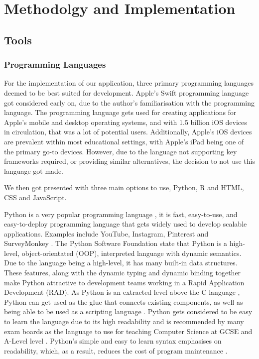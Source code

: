 \chapter{Methodolgy and Implementation}
	\label{chap:implementation}
	
	\section{Tools}
	
	\subsection{Programming Languages}
	
	For the implementation of our application, three primary programming languages deemed to be best suited for development. Apple's Swift programming language \cite{swift} got considered early on, due to the author's familiarisation with the programming language. The programming language gets used for creating applications for Apple's mobile and desktop operating systems, and with 1.5 billion \cite{9to5mac} iOS devices in circulation, that was a lot of potential users. Additionally, Apple's iOS devices are prevalent within most educational settings, with Apple's iPad being one of the primary go-to devices. However, due to the language not supporting key frameworks required, or providing similar alternatives, the decision to not use this language got made. 
	
	We then got presented with three main options to use, Python, R and HTML, CSS and JavaScript.
	
	Python is a very popular programming language \cite{wired_python, sof_dev_servay20}, it is fast, easy-to-use, and easy-to-deploy programming language that gets widely used to develop scalable applications. Examples include YouTube, Instagram, Pinterest and SurveyMonkey \cite{hackr.io}. The Python Software Foundation state that Python is a high-level, object-orientated (OOP), interpreted language with dynamic semantics. Due to the language being a high-level, it has many built-in data structures. These features, along with the dynamic typing and dynamic binding together make Python attractive to development teams working in a Rapid Application Development (RAD). As Python is an extracted level above the C language \cite{sto_cpython}, Python can get used as the glue that connects existing components, as well as being able to be used as a scripting language \cite{python_desc}. Python gets considered to be easy to learn the language due to its high readability and is recommended by many exam boards as the language to use for teaching Computer Science at GCSE and A-Level level \cite{list exam boards here}. Python's simple and easy to learn syntax emphasises on readability, which, as a result, reduces the cost of program maintenance \cite{python_desc, pyqt_rbc}. 
	
